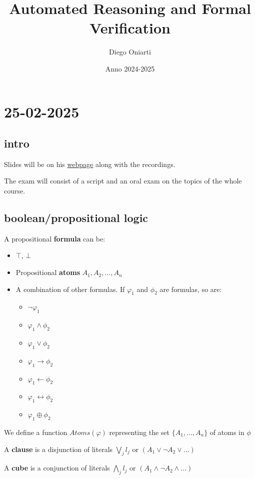 \documentclass{article}
\title{Automated Reasoning and Formal Verification}
\author{Diego Oniarti}
\date{Anno 2024-2025}
\begin{document}
\maketitle
\tableofcontents

\section{25-02-2025}
\subsection*{intro}
Slides will be on his \href{https://disi.unitn.it/rseba/DIDATTICA/arfv2025/}{webpage} along with the recordings.

The exam will consist of a script and an oral exam on the topics of the whole course.

\subsection*{boolean/propositional logic}
A propositional \textbf{formula} can be:
\begin{itemize}
    \item $\top$, $\bot$
    \item Propositional \textbf{atoms} $A_1, A_2, \dots, A_n$
    \item A combination of other formulas. If $\varphi_1$ and $\phi_2$ are formulas, so are:
        \begin{itemize}
            \item $\neg \varphi_1$
            \item $\varphi_1\wedge\phi_2$
            \item $\varphi_1\vee\phi_2$
            \item $\varphi_1\to\phi_2$
            \item $\varphi_1\leftarrow\phi_2$
            \item $\varphi_1\leftrightarrow\phi_2$
            \item $\varphi_1\oplus\phi_2$
        \end{itemize}
\end{itemize}

We define a function $Atoms(\varphi)$ representing the set $\{A_1,\dots,A_n\}$ of atoms in $\phi$

A \textbf{clause} is a disjunction of literals $\bigvee_j l_j$ or $(A_1\vee \neg A_2 \vee ...)$

A \textbf{cube} is a conjunction of literals $\bigwedge_j l_j$ or $(A_1\wedge \neg A_2 \wedge ...)$
\end{document}
